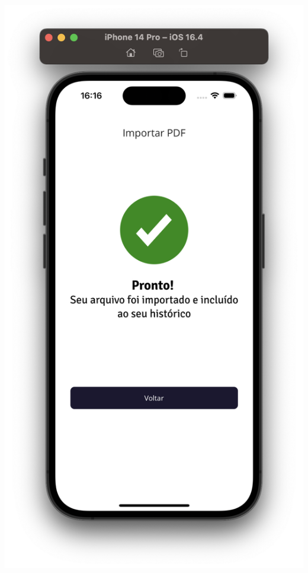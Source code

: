 \begin{center}
        \begin{minipage}{0.4\textwidth}
            \centering
            \includegraphics[scale=0.2]{figs/figura25.png}
            \label{fig:figura25}
        \end{minipage}%
    \end{center}


